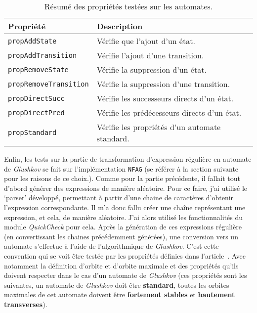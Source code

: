 \begin{table}[H]
    \centering
    \begin{tabular}{ll}
        \toprule
        \textbf{Propriété}                         & \textbf{Description}                           \\
        \midrule
        \texttt{propAddState}         & Vérifie que l'ajout d'un état.                 \\
        \texttt{propAddTransition}    & Vérifie l'ajout d'une transition.              \\
        \texttt{propRemoveState}      & Vérifie la suppression d'un état.              \\
        \texttt{propRemoveTransition} & Vérifie la suppression d'une transition.       \\
        \texttt{propDirectSucc}       & Vérifie les successeurs directs d'un état.     \\
        \texttt{propDirectPred}       & Vérifie les prédécesseurs directs d'un état.   \\
        \texttt{propStandard}         & Vérifie les propriétés d'un automate standard. \\
        \bottomrule
    \end{tabular}
    \caption{Résumé des propriétés testées sur les automates.}\label{tab:proprietes}
\end{table}

\vphantom{}

Enfin, les tests sur la partie de transformation d'expression régulière en
automate de \textit{Glushkov} se fait sur l'implémentation
\texttt{NFAG} (se référer à la section suivante pour les raisons de
ce choix.). Comme pour la partie précédente, il fallait tout d'abord générer
des expressions de manière aléatoire. Pour ce faire, j'ai utilisé le `parser'
développé, permettant à partir d'une chaine de caractères d'obtenir l'expression
correspondante. Il m'a donc fallu créer une chaîne représentant une expression,
et cela, de manière aléatoire. J'ai alors utilisé les fonctionnalités du module
\textit{QuickCheck} pour cela. Après la génération de ces expressions régulière
(en convertissant les chaines précédemment générées),
une conversion vers un automate s'effectue à l'aide de l'algorithmique de
\textit{Glushkov}. C'est cette convention qui se voit être testée par les
propriétés définies dans l'article~\cite{CaronZiadi2001}. Avec notamment la
définition d'orbite et d'orbite maximale et des propriétés qu'ils doivent
respecter dans le cas d'un automate de \textit{Glushkov} (ces propriétés sont
les suivantes, un automate de \textit{Glushkov} doit être \textbf{standard},
toutes les orbites maximales de cet automate doivent être
\textbf{fortement stables} et \textbf{hautement transverses}).

